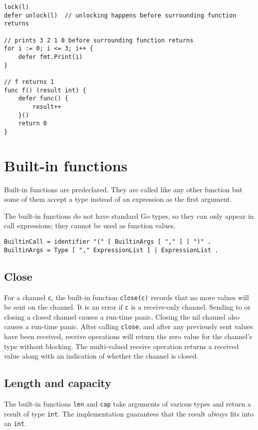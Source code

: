 \begin{Verbatim}[frame=single]
lock(l)
defer unlock(l)  // unlocking happens before surrounding function returns

// prints 3 2 1 0 before surrounding function returns
for i := 0; i <= 3; i++ {
    defer fmt.Print(i)
}

// f returns 1
func f() (result int) {
    defer func() {
        result++
    }()
    return 0
}
\end{Verbatim}

\section*{Built-in functions}

Built-in functions are predeclared.
They are called like any other function but some of them accept a type
instead of an expression as the first argument.

The built-in functions do not have standard Go types, so they can only
appear in call expressions; they cannot be used as
function values.

\begin{Verbatim}[frame=single]
BuiltinCall = identifier "(" [ BuiltinArgs [ "," ] ] ")" .
BuiltinArgs = Type [ "," ExpressionList ] | ExpressionList .
\end{Verbatim}

\subsection*{Close}

For a channel \texttt{c}, the built-in function \texttt{close(c)}
records that no more values will be sent on the channel. It is an
error if \texttt{c} is a receive-only channel. Sending to or closing
a closed channel causes a run-time panic. Closing the nil channel
also causes a run-time panic. After calling \texttt{close}, and
after any previously sent values have been received, receive
operations will return the zero value for the channel's type without
blocking. The multi-valued receive operation returns a received
value along with an indication of whether the channel is closed.

\subsection*{Length and capacity}

The built-in functions \texttt{len} and \texttt{cap} take arguments of
various types and return a result of type \texttt{int}. The
implementation guarantees that the result always fits into an
\texttt{int}.

